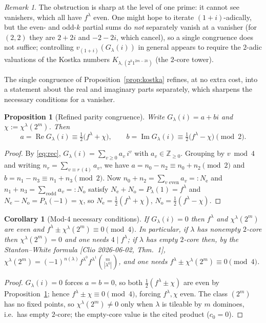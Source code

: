 \documentclass[11pt]{article}
\newtheorem{proposition}{Proposition}
\newtheorem{corollary}{Corollary}
\theoremstyle{definition}
\theoremstyle{remark}
\newtheorem{remark}{Remark}
\DeclareMathOperator{\Real}{Re}
\DeclareMathOperator{\Imag}{Im}
\newcommand{\ZZ}{\mathbb{Z}}
\newcommand{\la}{\lambda}
\begin{document}
\begin{remark}
The obstruction is sharp at the level of one prime: it cannot see vanishers,
which all have $f^\la$ even. One might hope to iterate $(1+i)$-adically, but the
even- and odd-$k$ partial sums do \emph{not} separately vanish at a vanisher
(for $(2,2)$ they are $2+2i$ and $-2-2i$, which cancel), so a single congruence
does not suffice; controlling $v_{(1+i)}(G_\la(i))$ in general appears to require
the $2$-adic valuations of the Kostka numbers $K_{\la,(2^k1^{2m-2k})}$ (the
$2$-core tower).
\end{remark}

The single congruence of Proposition~\ref{prop:kostka} refines, at no extra cost,
into a statement about the real and imaginary parts separately, which sharpens the
necessary conditions for a vanisher.

\begin{proposition}[Refined parity congruence]\label{prop:refined}
Write $G_\la(i)=a+bi$ and $\chi:=\chi^\la(2^m)$. Then
\[
   a=\Real G_\la(i)\equiv\tfrac12\big(f^\la+\chi\big),\qquad
   b=\Imag G_\la(i)\equiv\tfrac12\big(f^\la-\chi\big)\pmod 2 .
\]
\end{proposition}
\begin{proof}
By \eqref{eq:rec}, $G_\la(i)=\sum_{v\ge0}a_v\,i^{v}$ with $a_v\in\ZZ_{\ge0}$.
Grouping by $v\bmod4$ and writing $n_r=\sum_{v\equiv r\,(4)}a_v$, we have
$a=n_0-n_2\equiv n_0+n_2\pmod2$ and $b=n_1-n_3\equiv n_1+n_3\pmod2$. Now
$n_0+n_2=\sum_{v\text{ even}}a_v=:N_{\mathrm e}$ and $n_1+n_3=\sum_{v\text{
odd}}a_v=:N_{\mathrm o}$ satisfy $N_{\mathrm e}+N_{\mathrm o}=P_\la(1)=f^\la$ and
$N_{\mathrm e}-N_{\mathrm o}=P_\la(-1)=\chi$, so $N_{\mathrm e}=\tfrac12(f^\la+\chi)$,
$N_{\mathrm o}=\tfrac12(f^\la-\chi)$.
\end{proof}

\begin{corollary}[Mod-$4$ necessary conditions]\label{cor:nec}
If $G_\la(i)=0$ then $f^\la$ and $\chi^\la(2^m)$ are even and $f^\la\pm\chi^\la(2^m)
\equiv0\pmod4$. In particular, if $\la$ has nonempty $2$-core then
$\chi^\la(2^m)=0$ and one needs $4\mid f^\la$; if $\la$ has empty $2$-core then, by
the Stanton--White formula \emph{[Clio 2026-06-02, Thm.~1]},
$\chi^\la(2^m)=(-1)^{n(\la)}f^{\la^{0}}f^{\la^{1}}\binom{m}{|\la^{0}|}$, and one
needs $f^\la\pm\chi^\la(2^m)\equiv0\pmod4$.
\end{corollary}
\begin{proof}
$G_\la(i)=0$ forces $a=b=0$, so both $\tfrac12(f^\la\pm\chi)$ are even by
Proposition~\ref{prop:refined}; hence $f^\la\pm\chi\equiv0\pmod4$, forcing
$f^\la,\chi$ even. The class $(2^m)$ has no fixed points, so $\chi^\la(2^m)\neq0$
only when $\la$ is tileable by $m$ dominoes, i.e.\ has empty $2$-core; the
empty-core value is the cited product ($c_0=0$).
\end{proof}
\end{document}
